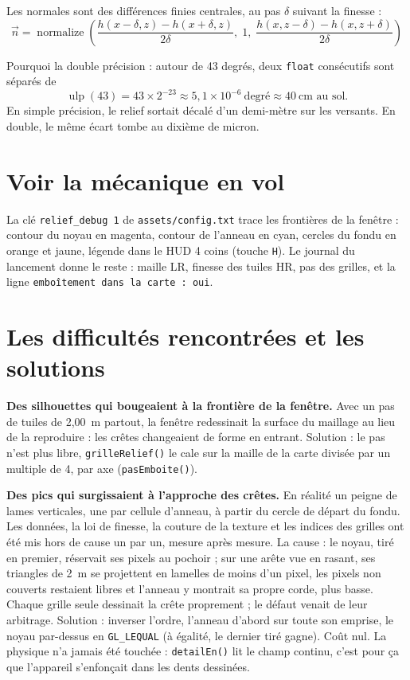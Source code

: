 \documentclass[a4paper,12pt]{article}
\newcommand{\code}[1]{\texttt{#1}}
\begin{document}
Les normales sont des différences finies centrales, au pas $\delta$ suivant la
finesse :
\begin{equation*}
  \vec{n} = \operatorname{normalize}\!\left(
  \frac{h(x-\delta,z) - h(x+\delta,z)}{2\delta},\;
  1,\;
  \frac{h(x,z-\delta) - h(x,z+\delta)}{2\delta}
  \right)
\end{equation*}

Pourquoi la double précision : autour de 43 degrés, deux \code{float}
consécutifs sont séparés de
\begin{equation*}
  \operatorname{ulp}(43) = 43 \times 2^{-23}
  \approx 5{,}1 \times 10^{-6}~\text{degré}
  \approx 40~\text{cm au sol.}
\end{equation*}
En simple précision, le relief sortait décalé d'un demi-mètre sur les
versants. En double, le même écart tombe au dixième de micron.

\section{Voir la mécanique en vol}

La clé \code{relief\_debug 1} de \code{assets/config.txt} trace les frontières
de la fenêtre : contour du noyau en magenta, contour de l'anneau en cyan,
cercles du fondu en orange et jaune, légende dans le HUD 4 coins (touche
\code{H}). Le journal du lancement donne le reste : maille LR, finesse des
tuiles HR, pas des grilles, et la ligne \code{emboîtement dans la carte : oui}.

\section{Les difficultés rencontrées et les solutions}

\textbf{Des silhouettes qui bougeaient à la frontière de la fenêtre.} Avec un
pas de tuiles de 2,00~m partout, la fenêtre redessinait la surface du maillage
au lieu de la reproduire : les crêtes changeaient de forme en entrant.
Solution : le pas n'est plus libre, \code{grilleRelief()} le cale sur la
maille de la carte divisée par un multiple de 4, par axe
(\code{pasEmboite()}).

\textbf{Des pics qui surgissaient à l'approche des crêtes.} En réalité un
peigne de lames verticales, une par cellule d'anneau, à partir du cercle de
départ du fondu. Les données, la loi de finesse, la couture de la texture et
les indices des grilles ont été mis hors de cause un par un, mesure après
mesure. La cause : le noyau, tiré en premier, réservait ses pixels au
pochoir ; sur une arête vue en rasant, ses triangles de 2~m se projettent en
lamelles de moins d'un pixel, les pixels non couverts restaient libres et
l'anneau y montrait sa propre corde, plus basse. Chaque grille seule dessinait
la crête proprement ; le défaut venait de leur arbitrage. Solution : inverser
l'ordre, l'anneau d'abord sur toute son emprise, le noyau par-dessus en
\code{GL\_LEQUAL} (à égalité, le dernier tiré gagne). Coût nul. La physique
n'a jamais été touchée : \code{detailEn()} lit le champ continu, c'est pour ça
que l'appareil s'enfonçait dans les dents dessinées.
\end{document}

